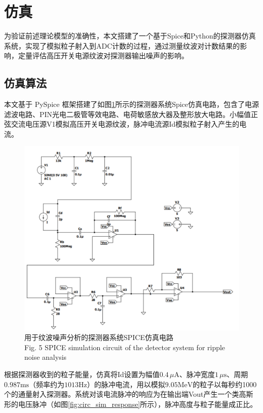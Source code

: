 \documentclass{ctexart}
\begin{document}
\section{仿真}

为验证前述理论模型的准确性，本文搭建了一个基于Spice和Python的探测器仿真系统，实现了模拟粒子射入到ADC计数的过程，通过测量纹波对计数结果的影响，定量评估高压开关电源纹波对探测器输出噪声的影响。

\subsection{仿真算法}

本文基于 PySpice 框架搭建了如图\ref{fig:circ_sim}所示的探测器系统Spice仿真电路，包含了电源滤波电路、PIN光电二极管等效电路、电荷敏感放大器及整形放大电路。小幅值正弦交流电压源V1模拟高压开关电源纹波，脉冲电流源Id模拟粒子射入产生的电流。

\begin{figure}[!h]
    \centering
    \includegraphics[width=\linewidth]{./circ_sim.png}
    \caption{用于纹波噪声分析的探测器系统SPICE仿真电路 \\ Fig. 5 SPICE simulation circuit of the detector system for ripple noise analysis}
    \label{fig:circ_sim}
\end{figure}

根据探测器收到的粒子能量，仿真将Id设置为幅值$0.4\,\mu\mathrm{A}$、脉冲宽度$1\,\mu\mathrm{s}$、周期$0.987\mathrm{ms}$（频率约为$1013\mathrm{Hz}$）的脉冲电流，用以模拟$9.05\mathrm{MeV}$的粒子以每秒约1000个的通量射入探测器。系统对该电流脉冲的响应为在输出端Vout产生一个类高斯形的电压脉冲（如图\ref{fig:circ_sim_response}所示），脉冲高度与粒子能量成正比。
\end{document}
